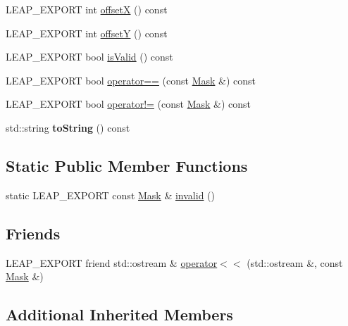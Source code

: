 \begin{DoxyCompactItemize}
\item 
L\+E\+A\+P\+\_\+\+E\+X\+P\+O\+RT int \hyperlink{class_leap_1_1_mask_a223fe75539f8afa78665ae55b2270dc2}{offsetX} () const
\item 
L\+E\+A\+P\+\_\+\+E\+X\+P\+O\+RT int \hyperlink{class_leap_1_1_mask_ab39e76c8f416f1c7f00a6a40e3652753}{offsetY} () const
\item 
L\+E\+A\+P\+\_\+\+E\+X\+P\+O\+RT bool \hyperlink{class_leap_1_1_mask_a8b579ee2f0a32247b4c38cc48b4ed208}{is\+Valid} () const
\item 
L\+E\+A\+P\+\_\+\+E\+X\+P\+O\+RT bool \hyperlink{class_leap_1_1_mask_aa2daf5211ff234c895b9f9564dc7374a}{operator==} (const \hyperlink{class_leap_1_1_mask}{Mask} \&) const
\item 
L\+E\+A\+P\+\_\+\+E\+X\+P\+O\+RT bool \hyperlink{class_leap_1_1_mask_ac73f5624c50061cd0c5a5c2f140c0830}{operator!=} (const \hyperlink{class_leap_1_1_mask}{Mask} \&) const
\item 
\mbox{\label{class_leap_1_1_mask_a17dde3d69f91b0dffb49ebce19b6cacd}} 
std\+::string {\bfseries to\+String} () const
\end{DoxyCompactItemize}
\subsection*{Static Public Member Functions}
\begin{DoxyCompactItemize}
\item 
static L\+E\+A\+P\+\_\+\+E\+X\+P\+O\+RT const \hyperlink{class_leap_1_1_mask}{Mask} \& \hyperlink{class_leap_1_1_mask_ab2eddf087a16d99191aca5cc2a4a508b}{invalid} ()
\end{DoxyCompactItemize}
\subsection*{Friends}
\begin{DoxyCompactItemize}
\item 
L\+E\+A\+P\+\_\+\+E\+X\+P\+O\+RT friend std\+::ostream \& \hyperlink{class_leap_1_1_mask_a5905cc939d0e7c29749499cde771dfce}{operator$<$$<$} (std\+::ostream \&, const \hyperlink{class_leap_1_1_mask}{Mask} \&)
\end{DoxyCompactItemize}
\subsection*{Additional Inherited Members}


